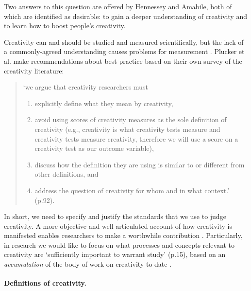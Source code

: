 \documentclass[10pt,letterpaper]{article}
\begin{document}
\noindent Two answers to this question are offered by Hennessey and Amabile, both of which are identified as desirable: to gain a deeper understanding of creativity and to learn how to boost people's creativity.

Creativity can and should be studied and measured scientifically, but the lack of a commonly-agreed understanding causes problems for measurement \cite{kaufman09}. Plucker et al. make recommendations about best practice based on their own survey of the creativity literature:
\begin{quote}
\noindent
`we argue that creativity researchers must

\begin{enumerate}
\renewcommand{\labelenumi}{(\alph{enumi})}
\item explicitly define what they mean by creativity,
\item avoid using scores of creativity measures as the sole definition of creativity (e.g., creativity is what creativity tests measure and creativity tests measure creativity, therefore we will use a score on a creativity test as our outcome variable),
\item discuss how the definition they are using is similar to or different from other definitions, and
\item address the question of creativity for whom and in what context.' \cite{plucker04defn} (p.92).
\end{enumerate}
\end{quote}

\noindent In short, we need to specify and justify the standards that we use to judge creativity. A more objective and well-articulated account of how creativity is manifested enables researchers to make a worthwhile contribution \cite{torrance67,plucker04defn,kaufman09}. Particularly, in research we would like to focus on what processes and concepts relevant to creativity are `sufficiently important to warrant study' \cite{vartanian14} (p.15), based on an {\em accumulation} of the body of work on creativity to date \cite{vartanian14}.

\paragraph{Definitions of creativity.}
\label{existing_defs}
\end{document}
